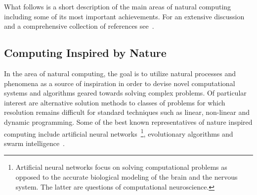 	What follows is a short description of the main areas of natural computing including some of its most important achievements. For an extensive discussion and a comprehensive collection of references see~\cite{de2007fundamentals}.

	\FloatBarrier

	\subsection{Computing Inspired by Nature}

		In the area of natural computing, the goal is to utilize natural processes and phenomena as a source of inspiration in order to devise novel computational systems and algorithms geared towards solving complex problems. Of particular interest are alternative solution methods to classes of problems for which resolution remains difficult for standard techniques such as linear, non-linear and dynamic programming. Some of the best known representatives of nature inspired computing include artificial neural networks~\footnote{Artificial neural networks focus on solving computational problems as opposed to the accurate biological modeling of the brain and the nervous system. The latter are questions of computational neuroscience.}, evolutionary algorithms and swarm intelligence~\cite{de2007fundamentals}.

